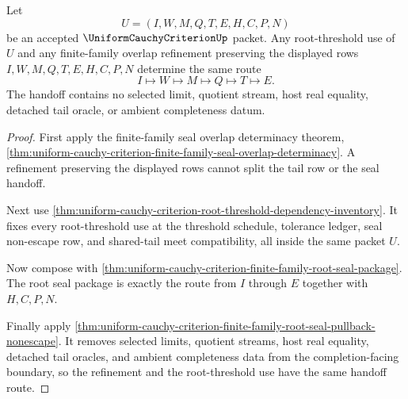 \begin{theorem}
\label{thm:uniform-cauchy-criterion-finite-family-refinement-handoff}
Let
$$
U=(I,W,M,Q,T,E,H,C,P,N)
$$
be an accepted $\UniformCauchyCriterionUp$ packet. Any root-threshold use of $U$ and any finite-family overlap refinement preserving the displayed rows $I,W,M,Q,T,E,H,C,P,N$ determine the same route
$$
I \longmapsto W \longmapsto M \longmapsto Q \longmapsto T \longmapsto E.
$$
The handoff contains no selected limit, quotient stream, host real equality, detached tail oracle, or ambient completeness datum.
\end{theorem}
\begin{proof}
First apply the finite-family seal overlap determinacy theorem, \autoref{thm:uniform-cauchy-criterion-finite-family-seal-overlap-determinacy}. A refinement preserving the displayed rows cannot split the tail row or the seal handoff.

Next use \autoref{thm:uniform-cauchy-criterion-root-threshold-dependency-inventory}. It fixes every root-threshold use at the threshold schedule, tolerance ledger, seal non-escape row, and shared-tail meet compatibility, all inside the same packet $U$.

Now compose with \autoref{thm:uniform-cauchy-criterion-finite-family-root-seal-package}. The root seal package is exactly the route from $I$ through $E$ together with $H,C,P,N$.

Finally apply \autoref{thm:uniform-cauchy-criterion-finite-family-root-seal-pullback-nonescape}. It removes selected limits, quotient streams, host real equality, detached tail oracles, and ambient completeness data from the completion-facing boundary, so the refinement and the root-threshold use have the same handoff route.
\end{proof}

